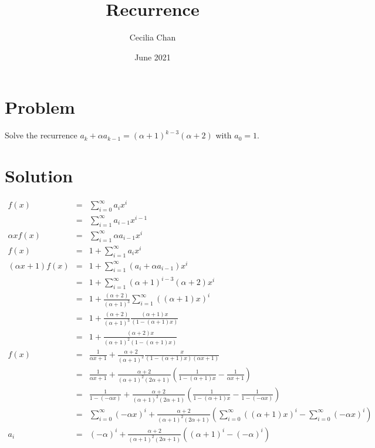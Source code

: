\documentclass{article}
\title{Recurrence}
\author{Cecilia Chan}
\date{June 2021}
\begin{document}
\maketitle

\section*{Problem}
Solve the recurrence $ a_k + \alpha a_{k-1} = (\alpha+1)^{k-3} (\alpha + 2) $ with $ a_0 = 1 $.

\section*{Solution}
\begin{eqnarray*}
                 f(x) &=& \sum\limits_{i=0}^{\infty} a_i x^i \\
                      &=& \sum\limits_{i=1}^{\infty} a_{i-1} x^{i-1} \\
        \alpha x f(x) &=& \sum\limits_{i=1}^{\infty} \alpha a_{i-1} x^i \\
                 f(x) &=& 1 + \sum\limits_{i=1}^{\infty} a_i x^i \\
  (\alpha x + 1) f(x) &=& 1 + \sum\limits_{i=1}^{\infty} (a_i + \alpha a_{i-1}) x^i \\
                      &=& 1 + \sum\limits_{i=1}^{\infty} (\alpha+1)^{i-3}(\alpha+2) x^i \\
                      &=& 1 + \frac{(\alpha+2)}{(\alpha+1)^3} \sum\limits_{i=1}^{\infty} ((\alpha+1)x)^i \\
                      &=& 1 + \frac{(\alpha+2)}{(\alpha+1)^3}\frac{(\alpha+1)x}{(1 - (\alpha+1)x)} \\
                      &=& 1 + \frac{(\alpha+2)x}{(\alpha+1)^2(1 - (\alpha+1)x)} \\
                 f(x) &=& \frac{1}{\alpha x + 1} + \frac{\alpha+2}{(\alpha+1)^2}\frac{x}{(1 - (\alpha+1)x)(\alpha x + 1)} \\
                      &=& \frac{1}{\alpha x + 1} + \frac{\alpha+2}{(\alpha+1)^2(2\alpha+1)}\left(\frac{1}{1 - (\alpha+1)x} - \frac{1}{\alpha x + 1}\right) \\
                      &=& \frac{1}{1 - (-\alpha x)} + \frac{\alpha+2}{(\alpha+1)^2(2\alpha+1)}\left(\frac{1}{1 - (\alpha+1)x} - \frac{1}{1 - (-\alpha x)}\right) \\
                      &=& \sum\limits_{i=0}^{\infty}(-\alpha x)^i + \frac{\alpha+2}{(\alpha+1)^2(2\alpha+1)}\left(\sum\limits_{i=0}^{\infty}((\alpha + 1)x)^i - \sum\limits_{i=0}^{\infty}(-\alpha x)^i\right) \\
                  a_i &=& (-\alpha)^i + \frac{\alpha+2}{(\alpha+1)^2(2\alpha+1)}\left((\alpha + 1)^i - (-\alpha)^i\right)
\end{eqnarray*}
\end{document}
